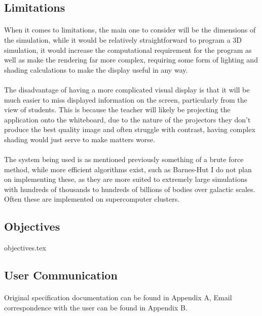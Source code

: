 \pagebreak

\subsection{Limitations}
\paragraph{}
When it comes to limitations, the main one to consider will be the dimensions of the simulation, while it would be relatively straightforward to program a 3D simulation, it would increase the computational requirement for the program as well as make the rendering far more complex, requiring some form of lighting and shading calculations to make the display useful in any way.

\paragraph{}
The disadvantage of having a more complicated visual display is that it will be much easier to miss displayed information on the screen, particularly from the view of students. This is because the teacher will likely be projecting the application onto the whiteboard, due to the nature of the projectors they don't produce the best quality image and often struggle with contrast, having complex shading would just serve to make matters worse.

\paragraph{}
The system being used is as mentioned previously something of a brute force method, while more efficient algorithms exist, such as Barnes-Hut I do not plan on implementing these, as they are more suited to extremely large simulations with hundreds of thousands to hundreds of billions of bodies over galactic scales. Often these are implemented on supercomputer clusters.

\subsection{Objectives}
{objectives.tex}

\subsection{User Communication}
\paragraph{}
Original specification documentation can be found in Appendix A, Email correspondence with the user can be found in Appendix B.

